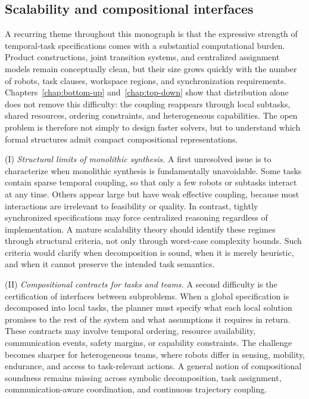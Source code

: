 \subsection{Scalability and compositional interfaces}
\label{sec:ch07_scalability}

A recurring theme throughout this monograph is that the expressive strength of
temporal-task specifications comes with a substantial computational burden.
Product constructions, joint transition systems, and centralized assignment
models remain conceptually clean, but their size grows quickly with the number
of robots, task clauses, workspace regions, and synchronization requirements.
Chapters~\ref{chap:bottom-up} and~\ref{chap:top-down} show that distribution
alone does not remove this difficulty: the coupling reappears through local
subtasks, shared resources, ordering constraints, and heterogeneous
capabilities. The open problem is therefore not simply to design faster
solvers, but to understand which formal structures admit compact
compositional representations.

(I) \emph{Structural limits of monolithic synthesis.}
A first unresolved issue is to characterize when monolithic synthesis is
fundamentally unavoidable. Some tasks contain sparse temporal coupling, so
that only a few robots or subtasks interact at any time. Others appear large
but have weak effective coupling, because most interactions are irrelevant to
feasibility or quality. In contrast, tightly synchronized specifications may
force centralized reasoning regardless of implementation. A mature
scalability theory should identify these regimes through structural criteria,
not only through worst-case complexity bounds. Such criteria would clarify
when decomposition is sound, when it is merely heuristic, and when it cannot
preserve the intended task semantics.

(II) \emph{Compositional contracts for tasks and teams.}
A second difficulty is the certification of interfaces between subproblems.
When a global specification is decomposed into local tasks, the planner must
specify what each local solution promises to the rest of the system and what
assumptions it requires in return. These contracts may involve temporal
ordering, resource availability, communication events, safety margins, or
capability constraints. The challenge becomes sharper for heterogeneous
teams, where robots differ in sensing, mobility, endurance, and access to
task-relevant actions. A general notion of compositional soundness remains
missing across symbolic decomposition, task assignment, communication-aware
coordination, and continuous trajectory coupling.

